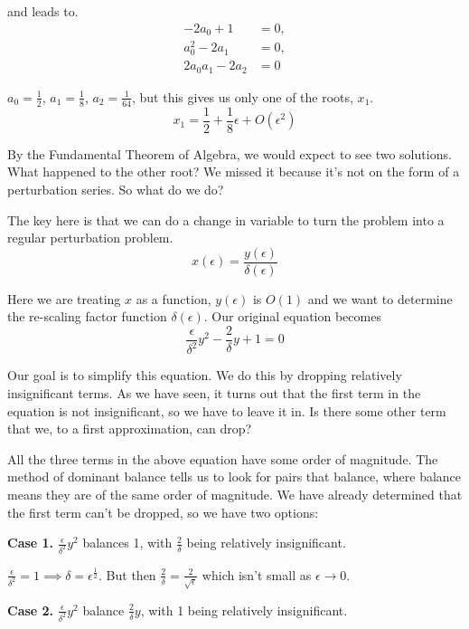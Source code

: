 \documentclass[12pt]{article}
\begin{document}
and leads to.
\begin{align}
- 2 a_0 + 1 &= 0, \\
a_0^2 - 2 a_1 &= 0, \\
2 a_0 a_1 -2 a_2 &= 0
\end{align}

$a_0 = \frac{1}{2}$, $a_1=\frac{1}{8}$, $a_2= \frac{1}{64}$, but this gives us
only one of the roots, $x_1$.
\begin{equation}
x_1 = \frac{1}{2} + \frac{1}{8} \epsilon + O(\epsilon^2)
\end{equation}

By the Fundamental Theorem of Algebra, we would expect to see two solutions.
What happened to the other root? We missed it because it's not on the form of
a perturbation series. So what do we do?

The key here is that we can do a change in variable to turn the problem into a
regular perturbation problem.
\begin{equation}
x(\epsilon) = \frac{y(\epsilon)}{\delta(\epsilon)}
\end{equation}

Here we are treating $x$ as a function, $y(\epsilon)$ is $O(1)$ and we want to
determine the re-scaling factor function $\delta(\epsilon)$. Our original
equation becomes
\begin{equation}
\frac{\epsilon}{\delta^2} y^2 - \frac{2}{\delta} y + 1 = 0
\end{equation}

Our goal is to simplify this equation. We do this by dropping relatively
insignificant terms. As we have seen, it turns out that the first term in the
equation is not insignificant, so we have to leave it in. Is there some other
term that we, to a first approximation, can drop?

All the three terms in the above equation have some order of magnitude. The method
of dominant balance tells us to look for pairs that balance, where balance means
they are of the same order of magnitude. We have already determined that the
first term can't be dropped, so we have two options:

\textbf{Case 1.} $\frac{\epsilon}{\delta^2} y^2$ balances 1, with $\frac{2}{\delta}$
being relatively insignificant.

$\frac{\epsilon}{\delta^2} = 1 \implies \delta = \epsilon^{\frac{1}{2}}$. But
then $\frac{2}{\delta} = \frac{2}{\sqrt{\epsilon}}$ which isn't small as
$\epsilon \to 0$.

\textbf{Case 2.} $\frac{\epsilon}{\delta^2} y^2$ balance $\frac{2}{\delta} y$,
with 1 being relatively insignificant.
\end{document}
